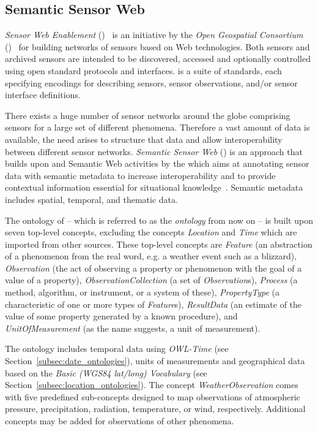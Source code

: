 \subsection{Semantic Sensor Web}
\label{subsec:onto1}

\emph{Sensor Web Enablement} ()~\cite{SensorWeb} is an initiative by the \emph{Open Geospatial Consortium} ()~\cite{OGC} for building networks of sensors based on Web technologies. Both sensors and archived sensors are intended to be discovered, accessed and optionally controlled using open standard protocols and interfaces.  is a suite of standards, each specifying encodings for describing sensors, sensor observations, and/or sensor interface definitions.

There exists a huge number of sensor networks around the globe comprising sensors for a large set of different phenomena. Therefore a vast amount of data is available, the need arises to structure that data and allow interoperability between different sensor networks. \emph{Semantic Sensor Web} () is an approach that builds upon  and Semantic Web activities by the  which aims at annotating sensor data with semantic metadata to increase interoperability and to provide contextual information essential for situational knowledge~\cite{SemanticSensorWeb}. Semantic metadata includes spatial, temporal, and thematic data.

The ontology of  -- which is referred to as the \emph{ ontology} from now on -- is built upon seven top-level concepts, excluding the concepts \emph{Location} and \emph{Time} which are imported from other sources. These top-level concepts are \emph{Feature} (an abstraction of a phenomenon from the real word, e.g. a weather event such as a blizzard), \emph{Observation} (the act of observing a property or phenomenon with the goal of a value of a property), \emph{ObservationCollection} (a set of \emph{Observation}s), \emph{Process} (a method, algorithm, or instrument, or a system of these), \emph{PropertyType} (a characteristic of one or more types of \emph{Feature}s), \emph{ResultData} (an estimate of the value of some property generated by a known procedure), and \emph{UnitOfMeasurement} (as the name suggests, a unit of measurement).

The  ontology includes temporal data using \emph{OWL-Time} (see Section~\ref{subsec:date_ontologies}), units of measurements and geographical data based on the \emph{Basic (WGS84 lat/long) Vocabulary} (see Section~\ref{subsec:location_ontologies}). The concept \emph{WeatherObservation} comes with five predefined sub-concepts designed to map observations of atmospheric pressure, precipitation, radiation, temperature, or wind, respectively. Additional concepts may be added for observations of other phenomena.

